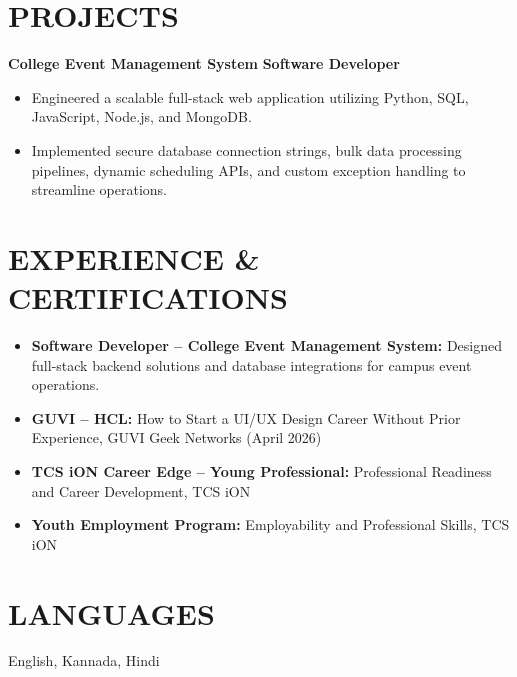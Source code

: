 \documentclass{article}
\begin{document}
\section*{PROJECTS}
\textbf{College Event Management System} \hfill \textbf{Software Developer}
\begin{itemize}[leftmargin=*, itemsep=0.2em]
    \item Engineered a scalable full-stack web application utilizing Python, SQL, JavaScript, Node.js, and MongoDB.
    \item Implemented secure database connection strings, bulk data processing pipelines, dynamic scheduling APIs, and custom exception handling to streamline operations.
\end{itemize}

\section*{EXPERIENCE \& CERTIFICATIONS}
\begin{itemize}[leftmargin=*, itemsep=0.3em]
    \item \textbf{Software Developer – College Event Management System:} Designed full-stack backend solutions and database integrations for campus event operations.
    \item \textbf{GUVI – HCL:} How to Start a UI/UX Design Career Without Prior Experience, GUVI Geek Networks (April 2026)
    \item \textbf{TCS iON Career Edge – Young Professional:} Professional Readiness and Career Development, TCS iON
    \item \textbf{Youth Employment Program:} Employability and Professional Skills, TCS iON
\end{itemize}

\section*{LANGUAGES}
English, Kannada, Hindi
\end{document}
